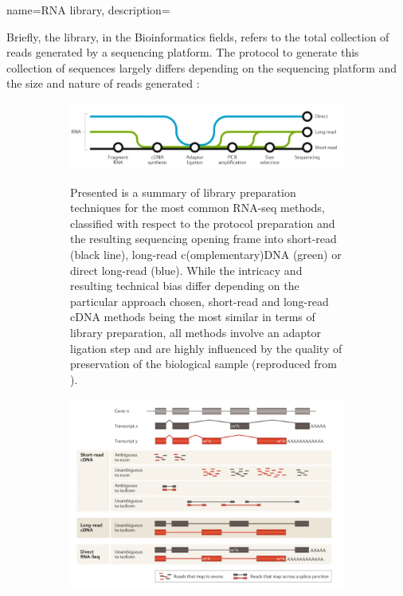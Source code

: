 {name=RNA library,
description={Briefly, the library, in the Bioinformatics fields, refers to the total collection of reads generated by a sequencing platform.
The protocol to generate this collection of sequences largely differs depending on the sequencing platform 
and the size and nature of reads generated :
\begin{figure}
     \centering
     \begin{subfigure}[p]{0.4\textwidth}
         \centering
         \includegraphics[width=\textwidth]{figures/biological_introduction/short_vs_long_library_preparation.png}
         \label{subfig:library-comparison-preparation}
         \caption[\textbf{Ecosystem of library preparation}]{Presented is a summary of library preparation techniques for the most common RNA-seq methods, classified with respect to the protocol preparation and the resulting sequencing opening frame into short-read (black line), long-read c(omplementary)DNA (green) or direct long-read (blue). While the intricacy and resulting technical bias differ depending on the particular approach chosen, short-read and long-read cDNA methods being the most similar in terms of library preparation, all methods involve an adaptor ligation step and are highly influenced by the quality of preservation of the biological sample (reproduced from \autocite[Fig. 1, part A]{stark_etal19}).}
     \end{subfigure}
     \hfill
     \begin{subfigure}[p]{0.55\textwidth}
         \centering
         \includegraphics[width=\textwidth]{figures/biological_introduction/short_vs_long_applications_and_limitations.png}

\end{subfigure}
\end{figure}}}

